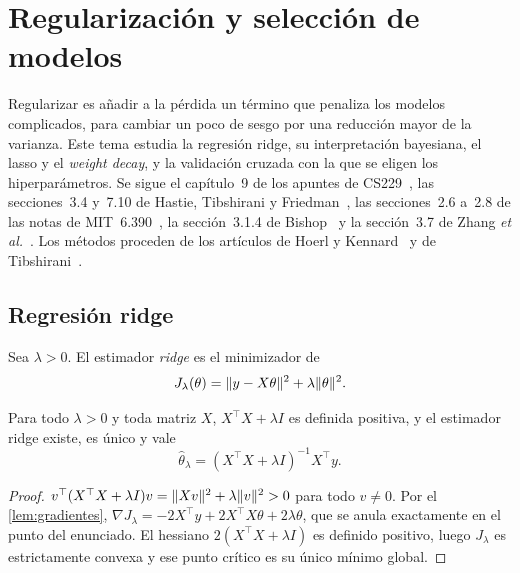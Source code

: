 \chapter{Regularización y selección de modelos}
\label{tema:6}

Regularizar es añadir a la pérdida un término que penaliza los modelos complicados, para cambiar un poco de sesgo por una reducción mayor de la varianza. Este tema estudia la regresión ridge, su interpretación bayesiana, el lasso y el \emph{weight decay}, y la validación cruzada con la que se eligen los hiperparámetros. Se sigue el capítulo~9 de los apuntes de CS229~\cite[§9.1--9.4]{cs229}, las secciones~3.4 y~7.10 de Hastie, Tibshirani y Friedman~\cite{esl}, las secciones~2.6 a~2.8 de las notas de MIT~6.390~\cite{mit6390}, la sección~3.1.4 de Bishop~\cite{bishop} y la sección~3.7 de Zhang \emph{et al.}~\cite{d2l}. Los métodos proceden de los artículos de Hoerl y Kennard~\cite{hoerl} y de Tibshirani~\cite{lasso}.

\section{Regresión ridge}

\begin{definicion}\label{def:ridge}
Sea $\lambda>0$. El estimador \emph{ridge} es el minimizador de
\[
J_\lambda(\theta)=\lVert y-X\theta\rVert^{2}+\lambda\lVert\theta\rVert^{2}.
\]
\end{definicion}

\begin{teorema}\label{teo:ridge}
Para todo $\lambda>0$ y toda matriz $X$, $X^{\top}X+\lambda I$ es definida positiva, y el estimador ridge existe, es único y vale
\[
\hat\theta_\lambda=(X^{\top}X+\lambda I)^{-1}X^{\top}y.
\]
\end{teorema}

\begin{proof}
$v^{\top}(X^{\top}X+\lambda I)v=\lVert Xv\rVert^{2}+\lambda\lVert v\rVert^{2}>0$ para todo $v\ne 0$. Por el \cref{lem:gradientes}, $\nabla J_\lambda=-2X^{\top}y+2X^{\top}X\theta+2\lambda\theta$, que se anula exactamente en el punto del enunciado. El hessiano $2(X^{\top}X+\lambda I)$ es definido positivo, luego $J_\lambda$ es estrictamente convexa y ese punto crítico es su único mínimo global.
\end{proof}

